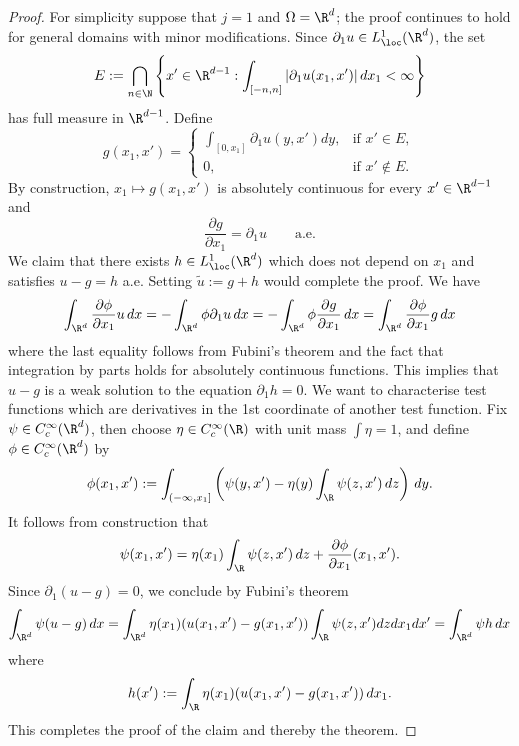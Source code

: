 \documentclass[reqno]{amsart}
\theoremstyle{definition}
\theoremstyle{remark}
\begin{document}
\begin{proof}
	For simplicity suppose that $j = 1$ and $\Omega = \R^d$; the proof continues to hold for general domains with minor modifications. Since $\partial_1 u \in L^1_\loc (\R^d)$, the set
		\[ E := \bigcap_{n \in \N} \left\{ x' \in \R^{d - 1} : \int_{[-n, n]} |\partial_1 u (x_1, x')| \, dx_1 < \infty \right\} \]
	has full measure in $\R^{d - 1}$. Define
		\[
			g (x_1, x')
				=
				\begin{cases}
					\int_{[0, x_1]} \partial_1 u(y, x') dy, 		
								&\text{if } x' \in E, \\
					0, 			&\text{if } x' \not\in E.
				\end{cases}
		\]	
	By construction, $x_1 \mapsto g (x_1, x')$ is absolutely continuous for every $x' \in \R^{d - 1}$ and 
		\[ \frac{\partial g}{\partial x_1} = \partial_1 u \qquad \text{a.e.} \]
	We claim that there exists $h \in L^1_\loc (\R^d)$ which does not depend on $x_1$ and satisfies $u - g = h$ a.e. Setting $\tilde u := g + h$ would complete the proof. We have
		\[ \int_{\R^d} \frac{\partial \phi}{\partial x_1} u \, dx = - \int_{\R^d} \phi \partial_1 u \, dx = - \int_{\R^d} \phi \frac{\partial g}{\partial x_1} \, dx = \int_{\R^d}\frac{\partial \phi}{\partial x_1} g \, dx  \]	
	where the last equality follows from Fubini's theorem and the fact that integration by parts holds for absolutely continuous functions. This implies that $u - g$ is a weak solution to the equation $\partial_1 h = 0$. We want to characterise test functions which are derivatives in the 1st coordinate of another test function. Fix $\psi \in C^\infty_c (\R^d)$, then choose $\eta \in C^\infty_c (\R)$ with unit mass $\int \eta = 1$, and define $\phi \in C^\infty_c (\R^d)$ by 
		\[ \phi (x_1, x') := \int_{(-\infty, x_1]} \left( \psi(y, x') - \eta(y) \int_\R \psi(z, x') \, dz \right) \, dy. \]
	It follows from construction that 
		\[ \psi(x_1, x') = \eta(x_1) \int_\R \psi(z, x') \, dz + \frac{\partial \phi}{\partial x_1} (x_1, x'). \]	
	Since $\partial_1 (u - g) = 0$, we conclude by Fubini's theorem
		\[ \int_{\R^d} \psi (u - g) \, dx = \int_{\R^d} \eta(x_1)(u(x_1, x') - g(x_1, x')) \int_\R \psi(z, x') dz dx_1 dx' = \int_{\R^d} \psi h \, dx\]	
	where
		\[ h (x') := \int_\R \eta (x_1)(u(x_1, x') - g(x_1, x')) \, dx_1.  \]	
	This completes the proof of the claim and thereby the theorem. 
\end{proof}
\fi
\end{document}
